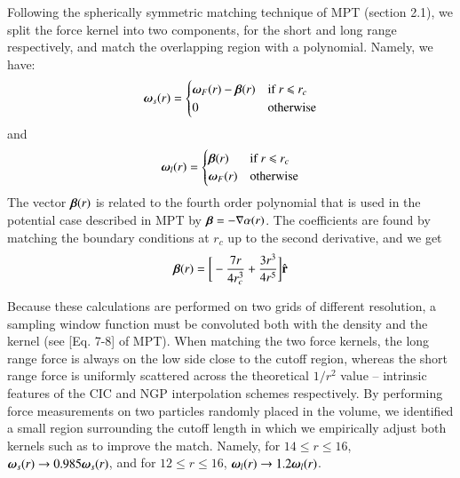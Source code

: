 Following the spherically symmetric matching technique of MPT (section 2.1), 
we split  the force kernel into two components, for the short and long range respectively, and 
match the overlapping region with a polynomial. Namely, we have:
\begin{eqnarray}
\mbox{\boldmath $\omega$}_{s}(r) = \begin{cases} \mbox{\boldmath $\omega$}_{F}(r) -  \mbox{\boldmath $\beta$}(r) &\mbox{if  } \mbox{$r$ $\le$ $r_{c}$ } \\
0 & \mbox{otherwise} 
\end{cases}
\end{eqnarray}
and
\begin{eqnarray}
\mbox{\boldmath $\omega$}_{l}(r) = \begin{cases} \mbox{\boldmath $\beta$}(r) &\mbox{if  } \mbox{$r$ $\le$ $r_{c}$ } \\
 \mbox{\boldmath $\omega$}_{F}(r)  &\mbox{otherwise} 
\end{cases}
\end{eqnarray}
The vector $\mbox{\boldmath $\beta$}(r)$ is related to the fourth order polynomial that is used in the potential case described in MPT by
 $ \mbox{\boldmath $\beta$} = - {\bf \nabla} \alpha(r)$. The coefficients are found by matching the boundary conditions at $r_{c}$ up to the second derivative,
 and we get
  \begin{eqnarray}
   \mbox{\boldmath $\beta$}(r) = \bigg[ -\frac{7 r}{4 r_{c}^{3}} + \frac{3 r^{3}}{4 r^{5}}\bigg] \hat{\bf r}
  \end{eqnarray}

Because these calculations are performed on two grids of different resolution, a sampling window function must be convoluted 
both with the density and the kernel (see [Eq. 7-8] of MPT).
When matching the two force kernels, the long range force is always on the low side close to the cutoff region, whereas the short range force is uniformly scattered across the theoretical $1/r^2$ value -- intrinsic features of the CIC and NGP interpolation schemes respectively.  By performing force measurements on two particles randomly placed in the volume, we identified a small region surrounding the cutoff length in which we empirically adjust both kernels such as to improve the match. Namely, for $14 \le r \le 16$, $\mbox{\boldmath $\omega$}_{s}({r}) \rightarrow 0.985\mbox{\boldmath $\omega$}_{s}({ r})$,
and for  $12 \le r \le 16$, $\mbox{\boldmath $\omega$}_{l}({r}) \rightarrow 1.2\mbox{\boldmath $\omega$}_{l}({ r})$.

